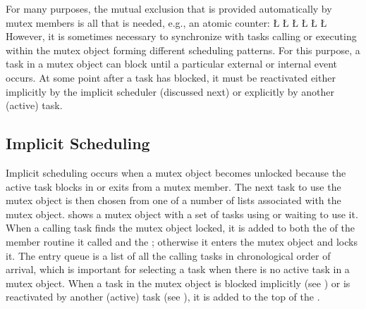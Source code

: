 \documentclass[openright,twoside]{report}
\begin{document}
For many purposes, the mutual exclusion that is provided automatically by mutex members is all that is needed, e.g., an atomic counter:
\LGinlinefalse\LGbegin\lgrinde
\L{}
\L{\LB{}}
\L{}
\L{\LB{}}
\L{\LB{}}
\CE{}\L{\LB{\}}}
\endlgrinde\LGend
However, it is sometimes necessary to synchronize with tasks calling or executing within the mutex object forming different scheduling patterns.
For this purpose, a task in a mutex object can block until a particular external or internal event occurs.
At some point after a task has blocked, it must be reactivated either implicitly by the implicit scheduler (discussed next) or explicitly by another (active) task.


\subsection{Implicit Scheduling}
\label{s:ImplicitScheduling}

Implicit scheduling occurs when a mutex object becomes unlocked because the active task blocks in or exits from a mutex member.
The next task to use the mutex object is then chosen from one of a number of lists associated with the mutex object.
 shows a mutex object with a set of tasks using or waiting to use it.
When a calling task finds the mutex object locked, it is added to both the  of the member routine it called and the ;
otherwise it enters the mutex object and locks it.
The entry queue is a list of all the calling tasks in chronological order of arrival, which is important for selecting a task when there is no active task in a mutex object.
When a task in the mutex object is blocked implicitly (see ) or is reactivated by another (active) task (see ), it is added to the top of the .
\end{document}
